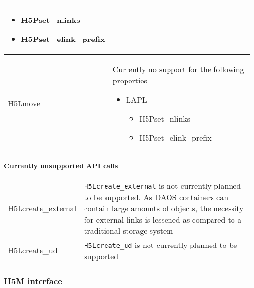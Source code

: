 \documentclass[../users_guide.tex]{subfiles}
\begin{document}
\begin{center}
\begin{tabularx}{\linewidth}{| X | >{\RaggedRight}X |}
\begin{itemize}
 \begin{itemize}
  \item H5Pset\_nlinks
  \item H5Pset\_elink\_prefix\footnotemark[1]
 \end{itemize}
\end{itemize}\\ \hline
H5Lmove & Currently no support for the following properties:
\begin{itemize}
 \item LAPL
 \begin{itemize}
  \item H5Pset\_nlinks
  \item H5Pset\_elink\_prefix\footnotemark[1]
 \end{itemize}
\end{itemize}\\ \hline

\end{tabularx}

\newpage

\textbf{Currently unsupported API calls}
\vspace{.2in} \\

\begin{tabularx}{\linewidth}{| X | >{\RaggedRight}X |}
\hline
\rowcolor{lightgray!50}%
\multicolumn{1}{| c |}{\textbf{API call}} & \multicolumn{1}{c |}{\textbf{Notes}} \\ \hline

H5Lcreate\_external & \texttt{H5Lcreate\_external} is not currently planned to be supported. As DAOS containers can contain large amounts of objects, the necessity for external links is lessened as compared to a traditional storage system\\ \hline
H5Lcreate\_ud & \texttt{H5Lcreate\_ud} is not currently planned to be supported\\ \hline

\end{tabularx}


\end{center}

\newpage

\subsubsection{H5M interface}
\end{document}
